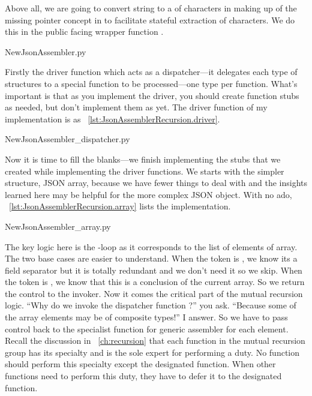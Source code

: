 Above all, we are going to convert string to a  of characters in making up of the
missing pointer concept in \python to facilitate stateful extraction of characters.
We do this in the public facing wrapper function .
\begin{table}[H]

{NewJsonAssembler.py}
\end{table}

Firstly the driver function which acts as a dispatcher---it delegates each type
of structures to a special function to be processed---one type per function.
What's important is that as you implement the driver, you should create function stubs as
needed, but don't implement them as yet.
The driver function of my implementation is as ~\autoref{lst:JsonAssemblerRecursion.driver}.

\begin{table}[H]

{NewJsonAssembler_dispatcher.py}
\end{table}

Now it is time to fill the blanks---we finish implementing the stubs that we created
while implementing the driver functions.
We starts with the simpler structure, JSON array, because we have fewer things to deal with and the
insights learned here may be helpful for the more complex JSON object.
With no ado, ~\autoref{lst:JsonAssemblerRecursion.array} lists the implementation.

\begin{table}[H]

{NewJsonAssembler_array.py}
\end{table}

The key logic here is the -loop as it corresponds to the list of elements of array.
The two base cases are easier to understand.
When the token is , we know its a field separator but it is totally redundant and we
don't need it so we skip.
When the token is \code{']'}, we know that this is a conclusion of the current array.
So we return the control to the invoker.
Now it comes the critical part of the mutual recursion logic.
``Why do we invoke the dispatcher function ?'' you ask.
``Because some of the array elements may be of composite types!'' I answer.
So we have to pass control back to the specialist function for generic assembler for each element.
Recall the discussion in ~\autoref{ch:recursion} that each function in the mutual recursion group
has its specialty and is the sole expert for performing a duty.
No function should perform this specialty except the designated function.
When other functions need to perform this duty, they have to defer it to the designated function.

